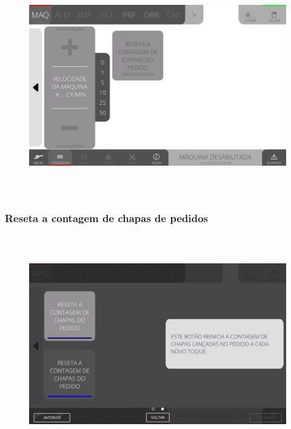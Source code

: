 \begin{figure}[h]
  \centering
  \includegraphics[width=576px,height=360px]{src/imagesFlexo/02-machine/e-Tela-Principal-2.png}
\end{figure}

\newpage
\thispagestyle{fancy}

\vspace*{\fill}

\subsubsection{\small{Reseta a contagem de chapas de pedidos}}

\begin{figure}[h]
  \centering
  \includegraphics[width=576px,height=360px]{src/imagesFlexo/02-machine/e-9.png}
\end{figure}

\vspace*{\fill}

